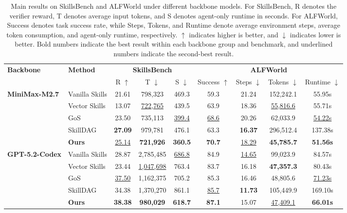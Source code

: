 \begin{table}[t]
\centering
\small
\renewcommand{\arraystretch}{1.12}
\setlength{\tabcolsep}{5pt}
\begin{tabular}{llccc|cccc}
\toprule
\multirow{2}{*}{\textbf{Backbone}} &
\multirow{2}{*}{\textbf{Method}}
& \multicolumn{3}{c|}{\textbf{SkillsBench}}
& \multicolumn{4}{c}{\textbf{ALFWorld}}\\
\cmidrule(lr){3-5} \cmidrule(lr){6-9}
& & R $\uparrow$ & T $\downarrow$ & S $\downarrow$
& Success $\uparrow$ & Steps $\downarrow$ & Tokens $\downarrow$ & Runtime $\downarrow$ \\
\midrule

\multirow{5}{*}{\textbf{MiniMax-M2.7}}
& Vanilla Skills
& 21.61 & 798,323 & 469.3
& 59.3 & 21.24 & 152,242.1 & 55.95s \\
& Vector Skills
& 13.07 & \underline{722,765} & 439.5
& 63.9 & 18.36 & \underline{55,816.6} & 55.71s \\
& GoS
& 23.50 & 735,113 & \underline{399.4}
& \underline{68.6} & 20.26 & 62,033.9 & \underline{54.22s} \\
& SkillDAG
& \textbf{27.09} & 979,781 & 476.1
& 63.3 & \textbf{16.37} & 296,512.4 & 137.38s \\
& \textbf{Ours}
& \underline{25.14} & \textbf{721,926} & \textbf{360.5}
& \textbf{70.7} & \underline{18.29} & \textbf{45,785.7} & \textbf{51.56s} \\


\midrule

\multirow{5}{*}{\textbf{GPT-5.2-Codex}}
& Vanilla Skills
& 28.87 & 2,785,485 & \underline{686.8}
& 84.9 & \underline{14.65} & 99,023.9 & 84.57s \\
& Vector Skills
& 23.44 & \underline{1,047,698} & 763.4
& 83.7 & 16.18 & \textbf{47,357.3} & 80.43s \\
& GoS
& \underline{37.50} & 1,162,375 & 705.2
& 85.3 & 16.46 & 48,805.6 & \underline{71.23s} \\
& SkillDAG
& 34.38 & 1,370,270 & 861.1
& \underline{85.7} &\textbf{ 11.73} & 105,449.9 & 169.10s \\
& \textbf{Ours}
& \textbf{38.38} & \textbf{980,029} & \textbf{618.7}
& \textbf{87.1} & 15.07 & \underline{47,409.1} & \textbf{66.01s} \\


\bottomrule
\end{tabular}
\caption{Main results on SkillsBench and ALFWorld under different backbone models.
For SkillsBench, R denotes the verifier reward, T denotes average input tokens,
and S denotes agent-only runtime in seconds. For ALFWorld, Success denotes task
success rate, while Steps, Tokens, and Runtime denote average environment steps,
average token consumption, and agent-only runtime, respectively.
$\uparrow$ indicates higher is better, and $\downarrow$ indicates lower is better.
Bold numbers indicate the best result within each backbone group and benchmark,
and underlined numbers indicate the second-best result.}
\label{tab:main_results}
\end{table}